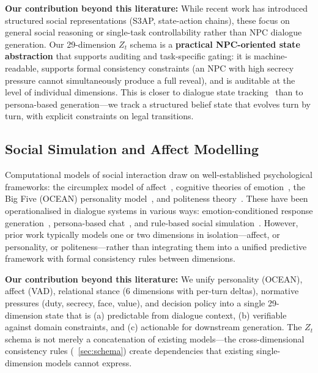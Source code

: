 \documentclass[11pt]{article}
\begin{document}
\textbf{Our contribution beyond this literature:}
While recent work has introduced structured social representations (S3AP, state-action chains), these focus on general social reasoning or single-task controllability rather than NPC dialogue generation.
Our 29-dimension $Z_t$ schema is a \textbf{practical NPC-oriented state abstraction} that supports auditing and task-specific gating: it is machine-readable, supports formal consistency constraints (an NPC with high secrecy pressure cannot simultaneously produce a full reveal), and is auditable at the level of individual dimensions.
This is closer to dialogue state tracking~\cite{mrksic2017neural,feng2023dialogue,jacqmin2024dialoguestate} than to persona-based generation---we track a structured belief state that evolves turn by turn, with explicit constraints on legal transitions.

\subsection{Social Simulation and Affect Modelling}

Computational models of social interaction draw on well-established psychological frameworks: the circumplex model of affect~\cite{russell1980circumplex}, cognitive theories of emotion~\cite{oatley1987towards}, the Big Five (OCEAN) personality model~\cite{digman1990personality}, and politeness theory~\cite{brown1987politeness}.
These have been operationalised in dialogue systems in various ways: emotion-conditioned response generation~\cite{zhou2018emotional}, persona-based chat~\cite{li2016persona}, and rule-based social simulation~\cite{gunkel2011computational}.
However, prior work typically models one or two dimensions in isolation---affect, or personality, or politeness---rather than integrating them into a unified predictive framework with formal consistency rules between dimensions.

\textbf{Our contribution beyond this literature:}
We unify personality (OCEAN), affect (VAD), relational stance (6 dimensions with per-turn deltas), normative pressures (duty, secrecy, face, value), and decision policy into a single 29-dimension state that is (a) predictable from dialogue context, (b) verifiable against domain constraints, and (c) actionable for downstream generation.
The $Z_t$ schema is not merely a concatenation of existing models---the cross-dimensional consistency rules (\textsection~\ref{sec:schema}) create dependencies that existing single-dimension models cannot express.
\end{document}
